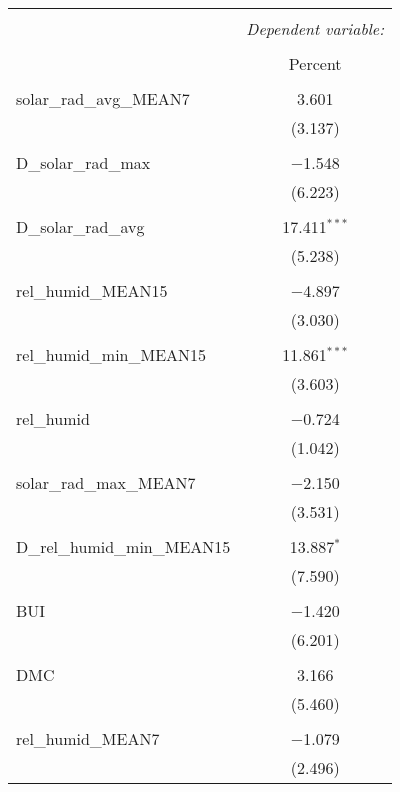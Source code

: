 
\begin{table}[!htbp] \centering 
  \caption{} 
  \label{} 
\begin{tabular}{@{\extracolsep{5pt}}lc} 
\\[-1.8ex]\hline 
\hline \\[-1.8ex] 
 & \multicolumn{1}{c}{\textit{Dependent variable:}} \\ 
\cline{2-2} 
\\[-1.8ex] & Percent \\ 
\hline \\[-1.8ex] 
 solar\_rad\_avg\_MEAN7 & 3.601 \\ 
  & (3.137) \\ 
  & \\ 
 D\_solar\_rad\_max & $-$1.548 \\ 
  & (6.223) \\ 
  & \\ 
 D\_solar\_rad\_avg & 17.411$^{***}$ \\ 
  & (5.238) \\ 
  & \\ 
 rel\_humid\_MEAN15 & $-$4.897 \\ 
  & (3.030) \\ 
  & \\ 
 rel\_humid\_min\_MEAN15 & 11.861$^{***}$ \\ 
  & (3.603) \\ 
  & \\ 
 rel\_humid & $-$0.724 \\ 
  & (1.042) \\ 
  & \\ 
 solar\_rad\_max\_MEAN7 & $-$2.150 \\ 
  & (3.531) \\ 
  & \\ 
 D\_rel\_humid\_min\_MEAN15 & 13.887$^{*}$ \\ 
  & (7.590) \\ 
  & \\ 
 BUI & $-$1.420 \\ 
  & (6.201) \\ 
  & \\ 
 DMC & 3.166 \\ 
  & (5.460) \\ 
  & \\ 
 rel\_humid\_MEAN7 & $-$1.079 \\ 
  & (2.496) \\ 

\end{tabular}
\end{table}
